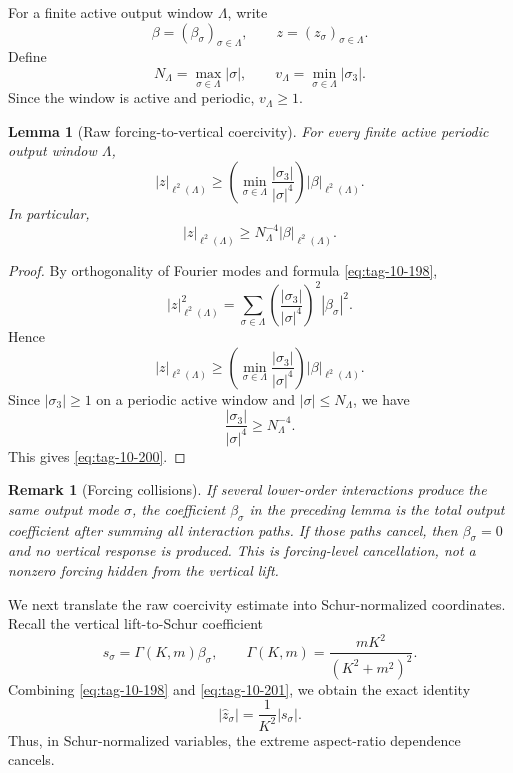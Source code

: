 \documentclass[11pt]{article}
\numberwithin{equation}{section}
\newtheorem{lemma}[theorem]{Lemma}
\newtheorem{remark}[theorem]{Remark}
\begin{document}
For a finite active output window \(\Lambda\), write
\[
\beta=(\beta_\sigma)_{\sigma\in\Lambda},
\qquad
z=(z_\sigma)_{\sigma\in\Lambda}.
\]
Define
\[
N_\Lambda=\max_{\sigma\in\Lambda}|\sigma|,
\qquad
v_\Lambda=\min_{\sigma\in\Lambda}|\sigma_3|.
\]
Since the window is active and periodic, \(v_\Lambda\ge1\).

\begin{lemma}[Raw forcing-to-vertical coercivity]
For every finite active periodic output window \(\Lambda\),
\begin{equation}
|z|_{\ell^2(\Lambda)}
\ge
\left(
\min_{\sigma\in\Lambda}
\frac{|\sigma_3|}{|\sigma|^4}
\right)
|\beta|_{\ell^2(\Lambda)}.
\label{eq:tag-10-199}
\end{equation}
In particular,
\begin{equation}
|z|_{\ell^2(\Lambda)}
\ge
N_\Lambda^{-4}
|\beta|_{\ell^2(\Lambda)}.
\label{eq:tag-10-200}
\end{equation}

\end{lemma}

\begin{proof}
By orthogonality of Fourier modes and formula \eqref{eq:tag-10-198},
\[
|z|_{\ell^2(\Lambda)}^2 =
\sum_{\sigma\in\Lambda}
\left(
\frac{|\sigma_3|}{|\sigma|^4}
\right)^2
|\beta_\sigma|^2.
\]
Hence
\[
|z|_{\ell^2(\Lambda)}
\ge
\left(
\min_{\sigma\in\Lambda}
\frac{|\sigma_3|}{|\sigma|^4}
\right)
|\beta|_{\ell^2(\Lambda)}.
\]
Since \(|\sigma_3|\ge1\) on a periodic active window and \(|\sigma|\le N_\Lambda\), we have
\[
\frac{|\sigma_3|}{|\sigma|^4}
\ge
N_\Lambda^{-4}.
\]
This gives \eqref{eq:tag-10-200}.
\end{proof}

\begin{remark}[Forcing collisions]
If several lower-order interactions produce the same output mode \(\sigma\), the coefficient \(\beta_\sigma\) in the preceding lemma is the total output coefficient after summing all interaction paths. If those paths cancel, then \(\beta_\sigma=0\) and no vertical response is produced. This is forcing-level cancellation, not a nonzero forcing hidden from the vertical lift.
\end{remark}

We next translate the raw coercivity estimate into Schur-normalized coordinates. Recall the vertical lift-to-Schur coefficient
\begin{equation}
s_\sigma=\Gamma(K,m)\beta_\sigma,
\qquad
\Gamma(K,m) =
\frac{mK^2}{(K^2+m^2)^2}.
\label{eq:tag-10-201}
\end{equation}
Combining \eqref{eq:tag-10-198} and \eqref{eq:tag-10-201}, we obtain the exact identity
\begin{equation}
|\widehat z_\sigma| =
\frac{1}{K^2}|s_\sigma|.
\label{eq:tag-10-202}
\end{equation}
Thus, in Schur-normalized variables, the extreme aspect-ratio dependence cancels.
\end{document}
